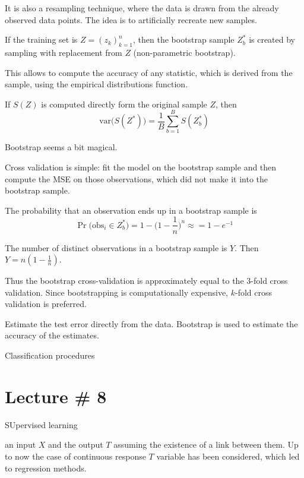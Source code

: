\documentclass[a4paper]{article}
\newcommand{\brac}[1]{{\left ( #1 \right )}}
\newcommand{\var}[0]{{\text{var}}}
\begin{document}
It is also a resampling technique, where the data is drawn from the already observed data points. The idea is to artificially recreate new samples.

If the training set is $Z=\brac{z_k}_{k=1}^n$, then the bootstrap sample $Z^*_b$ is created by sampling with replacement from $Z$ (non-parametric bootstrap).

This allows to compute the accuracy of any statistic, which is derived from the sample, using the empirical distributions function.

If $S(Z)$ is computed directly form the original sample $Z$, then 
\[\var\big(S(Z^*)\big) = \frac{1}{B}\sum_{b=1}^B S(Z^*_b)\]

Bootstrap seems a bit magical.

Cross validation is simple: fit the model on the bootstrap sample and then compute the MSE on those observations, which did not make it into the bootstrap sample.

The probability that an observation ends up in a bootstrap sample is 
\[\Pr\big(\text{obs}_i\in Z^*_b\big) = 1 - \big(1-\frac{1}{n}\big)^n\approx = 1-e^{-1}\]

The number of distinct observations in a bootstrap sample is $Y$. Then $Y = n (1-\frac{1}{n})$.

Thus the bootstrap cross-validation is approximately equal to the $3$-fold cross validation.
Since bootstrapping is computationally expensive, $k$-fold cross validation is preferred.




Estimate the test error directly from the data.
Bootstrap is used to estimate the accuracy of the estimates.




Classification procedures


\clearpage
\section{Lecture \# 8} %
\label{sec:lecture_8}

SUpervised learning

an input $X$ and the output $T$ assuming the existence of a link between them. Up to now the case of continuous response $T$ variable has been considered, which led to regression methods.
\end{document}
